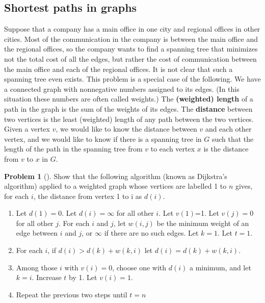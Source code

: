 \documentclass[10pt,]{book}
\newcommand{\terminology}[1]{\textbf{#1}}
\theoremstyle{plain}
\theoremstyle{definition}
\newtheorem{activity}[project]{Problem}
\theoremstyle{definition}
\numberwithin{equation}{chapter}
\begin{document}
\subsection[{Shortest paths in graphs}]{Shortest paths in graphs}\label{subsection-27}
Suppose that a company has a main office in one city and regional offices in other cities. Most of the communication in the company is between the main office and the regional offices, so the company wants to find a spanning tree that minimizes not the total cost of all the edges, but rather the cost of communication between the main office and each of the regional offices. It is not clear that such a spanning tree even exists. This problem is a special case of the following. We have a connected graph with nonnegative numbers assigned to its edges. (In this situation these numbers are often called weights.) The \terminology{(weighted) length} of a path in the graph is the sum of the weights of its edges. The \terminology{distance} between two vertices is the least (weighted) length of any path between the two vertices. Given a vertex \(v\), we would like to know the distance between \(v\) and each other vertex, and we would like to know if there is a spanning tree in \(G\) such that the length of the path in the spanning tree from \(v\) to each vertex \(x\) is the distance from \(v\) to \(x\) in \(G\).%
\begin{activity}[]\marginsymbol[-1em]{} \label{Dijkstra}
Show that the following algorithm (known as Dijkstra's algorithm) applied to a weighted graph whose vertices are labelled 1 to \(n\) gives, for each \(i\), the distance from vertex 1 to i as \(d(i)\). \leavevmode%
\begin{enumerate}
\item\hypertarget{li-24}{}Let \(d(1) = 0\). Let \(d(i) = \infty\) for all other \(i\).  Let \(v(1)\)=1. Let \(v(j) = 0\) for all other \(j\).  For each \(i\) and \(j\), let \(w(i,j)\) be the minimum weight of an edge between \(i\) and \(j\), or \(\infty\) if there are no such edges.  Let \(k=1\).  Let \(t=1\).%
\item\hypertarget{li-25}{}For each \(i\), if \(d(i)>d(k) + w(k,i)\) let \(d(i)= d(k) +w(k,i)\).%
\item\hypertarget{li-26}{}Among those \(i\) with \(v(i)=0\), choose one with \(d(i)\) a minimum, and let \(k=i\).  Increase \(t\) by 1. Let \(v(i) =1.\)%
\item\hypertarget{li-27}{}Repeat the previous two steps until \(t=n\)%
\end{enumerate}
%
\end{activity}
\end{document}
